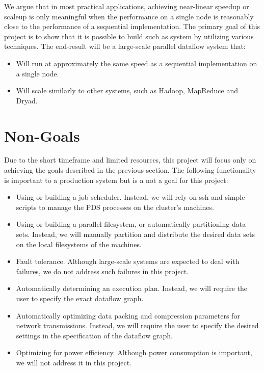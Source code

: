 \documentclass{acm_proc_article-sp}
\begin{document}
We argue that in most practical applications, achieving near-linear speedup or scaleup is only meaningful when the performance on a single node is reasonably close to the performance of a sequential implementation. The primary goal of this project is to show that it is possible to build such as system by utilizing various techniques. The end-result will be a large-scale parallel dataflow system that:
\begin{itemize}
\item Will run at approximately the same speed as a sequential implementation on a single node.
\item Will scale similarly to other systems, such as Hadoop, MapReduce and Dryad.
\end{itemize}
\section{Non-Goals}
Due to the short timeframe and limited resources, this project will focus only on achieving the goals described in the previous section. The following functionality is important to a production system but is a not a goal for this project:
\begin{itemize}
\item Using or building a job scheduler. Instead, we will rely on ssh and simple scripts to manage the PDS processes on the cluster's machines.
\item Using or building a parallel filesystem, or automatically partitioning data sets. Instead, we will manually partition and distribute the desired data sets on the local filesystems of the machines.
\item Fault tolerance. Although large-scale systems are expected to deal with failures, we do not address such failures in this project.
\item Automatically determining an execution plan. Instead, we will require the user to specify the exact dataflow graph.
\item Automatically optimizing data packing and compression parameters for network transmissions. Instead, we will require the user to specify the desired settings in the specification of the dataflow graph.
\item Optimizing for power efficiency. Although power consumption is important, we will not address it in this project.
\end{itemize}
\end{document}
